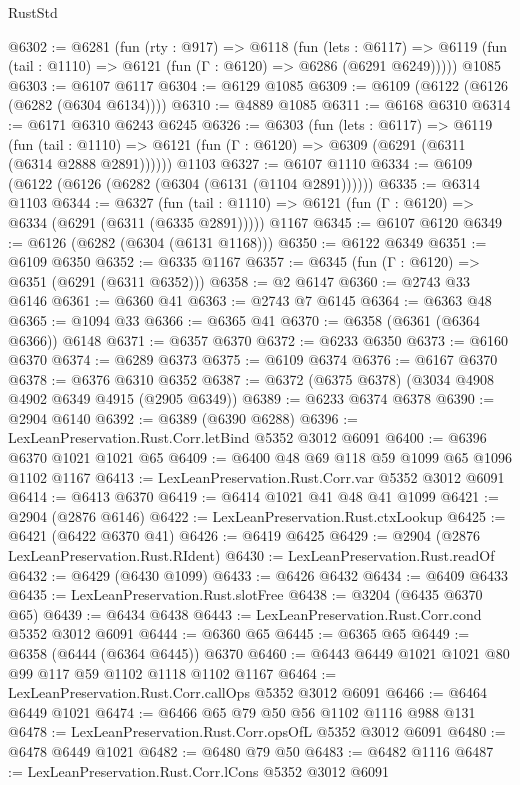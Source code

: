 \begin{lexlean}{RustStd}
\begin{coremodule}
@6302 := @6281
    (fun (rty : @917) =>
    @6118
      (fun (lets : @6117) =>
      @6119 (fun (tail : @1110) => @6121 (fun (Γ : @6120) => @6286 (@6291 @6249)))))
    @1085
@6303 := @6107 @6117
@6304 := @6129 @1085
@6309 := @6109 (@6122 (@6126 (@6282 (@6304 @6134))))
@6310 := @4889 @1085
@6311 := @6168 @6310
@6314 := @6171 @6310 @6243 @6245
@6326 := @6303
    (fun (lets : @6117) =>
    @6119
      (fun (tail : @1110) => @6121 (fun (Γ : @6120) => @6309 (@6291 (@6311 (@6314 @2888 @2891))))))
    @1103
@6327 := @6107 @1110
@6334 := @6109 (@6122 (@6126 (@6282 (@6304 (@6131 (@1104 @2891))))))
@6335 := @6314 @1103
@6344 := @6327
    (fun (tail : @1110) => @6121 (fun (Γ : @6120) => @6334 (@6291 (@6311 (@6335 @2891)))))
    @1167
@6345 := @6107 @6120
@6349 := @6126 (@6282 (@6304 (@6131 @1168)))
@6350 := @6122 @6349
@6351 := @6109 @6350
@6352 := @6335 @1167
@6357 := @6345 (fun (Γ : @6120) => @6351 (@6291 (@6311 @6352)))
@6358 := @2 @6147
@6360 := @2743 @33 @6146
@6361 := @6360 @41
@6363 := @2743 @7 @6145
@6364 := @6363 @48
@6365 := @1094 @33
@6366 := @6365 @41
@6370 := @6358 (@6361 (@6364 @6366)) @6148
@6371 := @6357 @6370
@6372 := @6233 @6350
@6373 := @6160 @6370
@6374 := @6289 @6373
@6375 := @6109 @6374
@6376 := @6167 @6370
@6378 := @6376 @6310 @6352
@6387 := @6372 (@6375 @6378) (@3034 @4908 @4902 @6349 @4915 (@2905 @6349))
@6389 := @6233 @6374 @6378
@6390 := @2904 @6140
@6392 := @6389 (@6390 @6288)
@6396 := LexLeanPreservation.Rust.Corr.letBind @5352 @3012 @6091
@6400 := @6396 @6370 @1021 @1021 @65
@6409 := @6400 @48 @69 @118 @59 @1099 @65 @1096 @1102 @1167
@6413 := LexLeanPreservation.Rust.Corr.var @5352 @3012 @6091
@6414 := @6413 @6370
@6419 := @6414 @1021 @41 @48 @41 @1099
@6421 := @2904 (@2876 @6146)
@6422 := LexLeanPreservation.Rust.ctxLookup
@6425 := @6421 (@6422 @6370 @41)
@6426 := @6419 @6425
@6429 := @2904 (@2876 LexLeanPreservation.Rust.RIdent)
@6430 := LexLeanPreservation.Rust.readOf
@6432 := @6429 (@6430 @1099)
@6433 := @6426 @6432
@6434 := @6409 @6433
@6435 := LexLeanPreservation.Rust.slotFree
@6438 := @3204 (@6435 @6370 @65)
@6439 := @6434 @6438
@6443 := LexLeanPreservation.Rust.Corr.cond @5352 @3012 @6091
@6444 := @6360 @65
@6445 := @6365 @65
@6449 := @6358 (@6444 (@6364 @6445)) @6370
@6460 := @6443 @6449 @1021 @1021 @80 @99 @117 @59 @1102 @1118 @1102 @1167
@6464 := LexLeanPreservation.Rust.Corr.callOps @5352 @3012 @6091
@6466 := @6464 @6449 @1021
@6474 := @6466 @65 @79 @50 @56 @1102 @1116 @988 @131
@6478 := LexLeanPreservation.Rust.Corr.opsOfL @5352 @3012 @6091
@6480 := @6478 @6449 @1021
@6482 := @6480 @79 @50
@6483 := @6482 @1116
@6487 := LexLeanPreservation.Rust.Corr.lCons @5352 @3012 @6091

\end{coremodule}
\end{lexlean}
